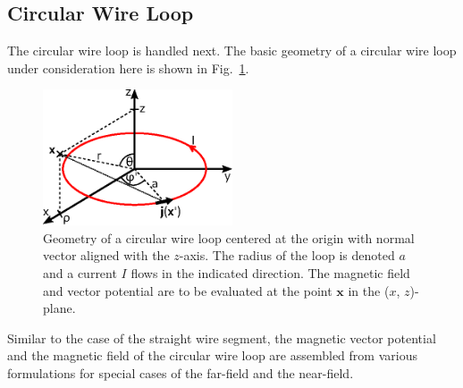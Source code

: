 \subsection{Circular Wire Loop}
The circular wire loop is handled next.
The basic geometry of a circular wire loop under consideration here is shown in Fig.~\ref{fig:circularWireLoop}.
\begin{figure}[htbp]
 \centering
 \includegraphics[width=0.5\textwidth]{img/circularWireLoop.eps}
 \caption{Geometry of a circular wire loop centered at the origin with normal vector aligned with the $z$-axis.
          The radius of the loop is denoted $a$ and a current $I$ flows in the indicated direction.
          The magnetic field and vector potential are to be evaluated at the point $\mathbf{x}$ in the ($x$, $z$)-plane.}
 \label{fig:circularWireLoop}
\end{figure}

Similar to the case of the straight wire segment,
the magnetic vector potential and the magnetic field of the circular wire loop
are assembled from various formulations for special cases of the far-field and the near-field.

